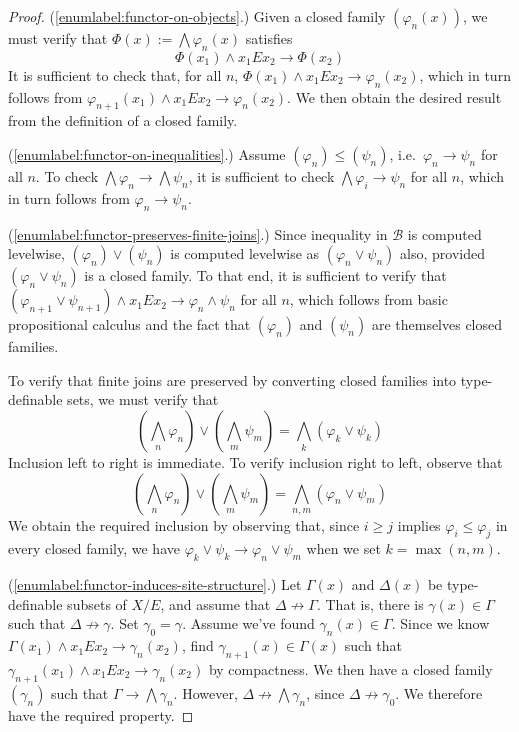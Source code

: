 \documentclass{article}
\theoremstyle{definition}
\newcommand{\B}{\mathcal{B}}
\begin{document}
\begin{proof}
  (\ref{enumlabel:functor-on-objects}.) Given a closed family $(\varphi_n(x))$, we must verify that $\Phi(x) := \bigwedge \varphi_n(x)$ satisfies
  \begin{equation*}
    \Phi(x_1) \wedge x_1 E x_2 \rightarrow \Phi(x_2)
  \end{equation*}
  It is sufficient to check that, for all $n$, $\Phi(x_1) \wedge x_1 E x_2 \rightarrow \varphi_n(x_2)$, which in turn follows from $\varphi_{n+1}(x_1) \wedge x_1 E x_2 \rightarrow \varphi_n(x_2)$. We then obtain the desired result from the definition of a closed family.

  (\ref{enumlabel:functor-on-inequalities}.) Assume $(\varphi_n) \leq (\psi_n)$, i.e.\ $\varphi_n \rightarrow \psi_n$ for all $n$. To check $\bigwedge \varphi_n \rightarrow \bigwedge \psi_n$, it is sufficient to check $\bigwedge \varphi_i \rightarrow \psi_n$ for all $n$, which in turn follows from $\varphi_n \rightarrow \psi_n$.

  (\ref{enumlabel:functor-preserves-finite-joins}.) Since inequality in $\B$ is computed levelwise, $(\varphi_n) \vee (\psi_n)$ is computed levelwise as $(\varphi_n \vee \psi_n)$ also, provided $(\varphi_n \vee \psi_n)$ is a closed family. To that end, it is sufficient to verify that $(\varphi_{n+1} \vee \psi_{n+1}) \wedge x_1 E x_2 \rightarrow \varphi_n \wedge \psi_n$ for all $n$, which follows from basic propositional calculus and the fact that $(\varphi_n)$ and $(\psi_n)$ are themselves closed families.

  To verify that finite joins are preserved by converting closed families into type-definable sets, we must verify that
  \begin{equation*}
    \left(\bigwedge_n \varphi_n\right) \vee \left(\bigwedge_m \psi_m\right) = \bigwedge_k (\varphi_k \vee \psi_k)
  \end{equation*}
  Inclusion left to right is immediate. To verify inclusion right to left, observe that
  \begin{equation*}
    \left(\bigwedge_n \varphi_n\right) \vee \left(\bigwedge_m \psi_m\right) = \bigwedge_{n,m} (\varphi_n \vee \psi_m)
  \end{equation*}
  We obtain the required inclusion by observing that, since $i \geq j$ implies $\varphi_i \leq \varphi_j$ in every closed family, we have $\varphi_k \vee \psi_k \rightarrow \varphi_n \vee \psi_m$ when we set $k = \max(n,m)$.

  (\ref{enumlabel:functor-induces-site-structure}.) Let $\Gamma(x)$ and $\Delta(x)$ be type-definable subsets of $X/E$, and assume that $\Delta \not\rightarrow \Gamma$. That is, there is $\gamma(x) \in \Gamma$ such that $\Delta \not\rightarrow \gamma$. Set $\gamma_0 = \gamma$. Assume we've found $\gamma_n(x) \in \Gamma$. Since we know $\Gamma(x_1) \wedge x_1 E x_2 \rightarrow \gamma_n(x_2)$, find $\gamma_{n+1}(x) \in \Gamma(x)$ such that $\gamma_{n+1}(x_1) \wedge x_1 E x_2 \rightarrow \gamma_n(x_2)$ by compactness. We then have a closed family $(\gamma_n)$ such that $\Gamma \rightarrow \bigwedge \gamma_n$. However, $\Delta \not\rightarrow \bigwedge \gamma_n$, since $\Delta \not\rightarrow \gamma_0$. We therefore have the required property.
\end{proof}
\end{document}
